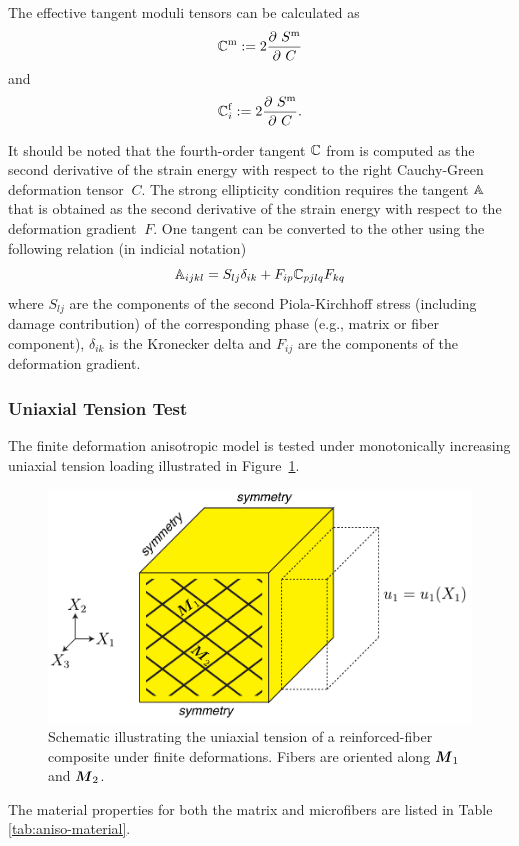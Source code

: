 \documentclass[12pt]{article}
\newcommand{\mtrx}{{\text{m}}}
\newcommand{\fiber}{{\text{f}}}
\numberwithin{equation}{section}
\begin{document}
The effective tangent moduli tensors can be calculated as
\begin{equation}\label{eq:aniso-tangent1}
  \bbC^\mtrx
  :=
  2 \frac{\partial ~S^\mtrx}{\partial~C}
\end{equation}
and
\begin{equation}\label{eq:aniso-tangent2}
  \bbC^\fiber_i
  :=
  2 \frac{\partial ~S^\mtrx}{\partial~C}.
\end{equation}

It should be noted that the fourth-order tangent $\mathbb{C}$ from
 is computed as the second derivative of the
strain energy with respect to the right Cauchy-Green deformation
tensor $~C$. The strong ellipticity condition
 requires the tangent $\mathbb{A}$ that is
obtained as the second derivative of the strain energy with respect to
the deformation gradient $~F$. One tangent can be converted to the
other using the following relation (in indicial notation)
\begin{equation}\label{eq:aniso-tangent3}
  \mathbb{A}_{ijkl} = S_{lj} \delta_{ik}
    + F_{ip} \mathbb{C}_{pjlq} F_{kq}
\end{equation}
where $S_{lj}$ are the components of the second Piola-Kirchhoff stress
(including damage contribution) of the corresponding phase (e.g.,
matrix or fiber component), $\delta_{ik}$ is the Kronecker delta and
$F_{ij}$ are the components of the deformation gradient.

\subsubsection{Uniaxial Tension Test}

The finite deformation anisotropic model is tested under monotonically
increasing uniaxial tension loading illustrated in Figure~\ref{fig:composite_tension}.
\begin{figure}[!htbp]
 \centering
      \includegraphics[width=120mm]{figs/composite_tension_schematic.pdf}
     \caption{Schematic illustrating the uniaxial tension of a reinforced-fiber composite under finite deformations. Fibers are oriented along ${\boldsymbol{M}}_{1}$ and ${\boldsymbol{M}}_{2}$.}
     \label{fig:composite_tension}
\end{figure}
The material properties for both
the matrix and microfibers are listed in Table~
\ref{tab:aniso-material}.
\end{document}
